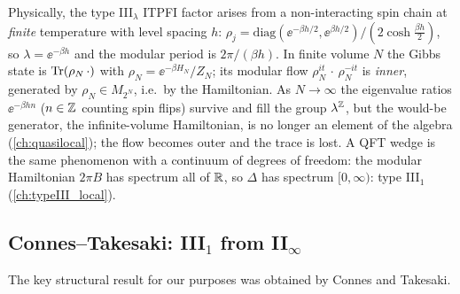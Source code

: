Physically, the type III$_\lambda$ ITPFI factor arises from a non-interacting spin chain at \emph{finite} temperature with level spacing $h$: $\rho_j=\mathrm{diag}(\ee^{-\beta h/2},\allowbreak\ee^{\beta h/2})/(2\cosh\tfrac{\beta h}2)$, so $\lambda=\ee^{-\beta h}$ and the modular period is $2\pi/(\beta h)$. In finite volume $N$ the Gibbs state is $\operatorname{Tr}(\rho_N\,\cdot)$ with $\rho_N=\ee^{-\beta H_N}/Z_N$; its modular flow $\rho_N^{it}\,\cdot\,\rho_N^{-it}$ is \emph{inner}, generated by $\rho_N\in M_{2^N}$, i.e.\ by the Hamiltonian. As $N\to\infty$ the eigenvalue ratios $\ee^{-\beta hn}$ ($n\in\mathbb{Z}$ counting spin flips) survive and fill the group $\lambda^{\mathbb{Z}}$, but the would-be generator, the infinite-volume Hamiltonian, is no longer an element of the algebra (\cref{ch:quasilocal}); the flow becomes outer and the trace is lost. A QFT wedge is the same phenomenon with a continuum of degrees of freedom: the modular Hamiltonian $2\pi B$ has spectrum all of $\mathbb{R}$, so $\Delta$ has spectrum $[0,\infty)$: type III$_1$ (\cref{ch:typeIII_local}).

\subsection{Connes--Takesaki: III$_1$ from II$_\infty$}

The key structural result for our purposes was obtained by Connes and Takesaki.

